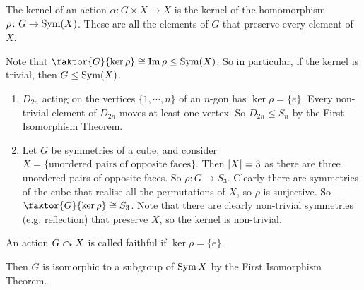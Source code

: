 \begin{definition}
	The kernel of an action \(\alpha\colon G \times X \to X\) is the kernel of the homomorphism \(\rho\colon G \to \operatorname{Sym}(X)\).
	These are all the elements of \(G\) that preserve every element of \(X\).
\end{definition}
Note that \(\faktor{G}{\ker \rho} \cong \Im \rho \leq \Sym(X)\).
So in particular, if the kernel is trivial, then \(G \leq \operatorname{Sym}(X)\).
\begin{enumerate}
	\item \(D_{2n}\) acting on the vertices \(\{ 1, \cdots, n \}\) of an \(n\)-gon has \(\ker\rho = \{ e \}\).
	      Every non-trivial element of \(D_{2n}\) moves at least one vertex.
	      So \(D_{2n} \leq S_n\) by the First Isomorphism Theorem.
	\item Let \(G\) be symmetries of a cube, and consider \(X = \{ \text{unordered pairs of opposite faces} \}\).
	      Then \(\abs{X} = 3\) as there are three unordered pairs of opposite faces.
	      So \(\rho\colon G \to S_3\).
	      Clearly there are symmetries of the cube that realise all the permutations of \(X\), so \(\rho\) is surjective.
	      So \(\faktor{G}{\ker \rho} \cong S_3\).
	      Note that there are clearly non-trivial symmetries (e.g.
	      reflection) that preserve \(X\), so the kernel is non-trivial.
\end{enumerate}
\begin{definition}
	An action \(G \curvearrowright X\) is called faithful if \(\ker \rho = \{ e \}\).
\end{definition}
Then \(G\) is isomorphic to a subgroup of \(\operatorname{Sym} X\) by the First Isomorphism Theorem.

